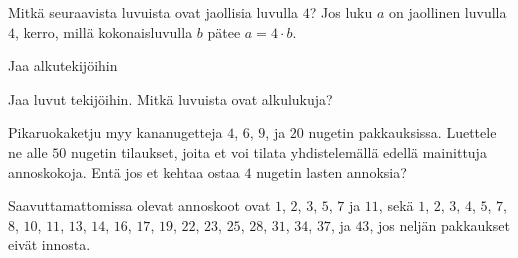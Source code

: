 \begin{tehtavasivu}

\begin{tehtava}
	Mitkä seuraavista luvuista ovat jaollisia luvulla $4$? Jos luku $a$ on jaollinen luvulla $4$, kerro, millä kokonaisluvulla $b$ pätee $a = 4 \cdot b$. 
	\begin{vastaus}
    \end{vastaus}
\end{tehtava}

\begin{tehtava}
    Jaa alkutekijöihin
	\alakohdat{
		§ $12$
		§ $15$
		§ $28$
		§ $30$
		§ $64$
		§ $90$
		§ $100$.
	}
    \begin{vastaus} %
    \end{vastaus}
\end{tehtava}

	\begin{tehtava}
Jaa luvut tekijöihin. Mitkä luvuista ovat alkulukuja?
	 \begin{vastaus}
	 \end{vastaus}
	\end{tehtava}
	
\begin{tehtava}
Pikaruokaketju myy kananugetteja $4$, $6$, $9$, ja $20$ nugetin pakkauksissa. Luettele ne alle $50$ nugetin tilaukset, joita et voi tilata yhdistelemällä edellä mainittuja annoskokoja. Entä jos et kehtaa ostaa $4$ nugetin lasten annoksia?
	\begin{vastaus}
		Saavuttamattomissa olevat annoskoot ovat $1$, $2$, $3$, $5$, $7$ ja $11$, sekä $1$, $2$, $3$, $4$, $5$, $7$, $8$, $10$, $11$, $13$, $14$, $16$, $17$, $19$, $22$, $23$, $25$, $28$, $31$, $34$, $37$, ja $43$, jos neljän pakkaukset eivät innosta.
	\end{vastaus}
\end{tehtava}

\end{tehtavasivu}
